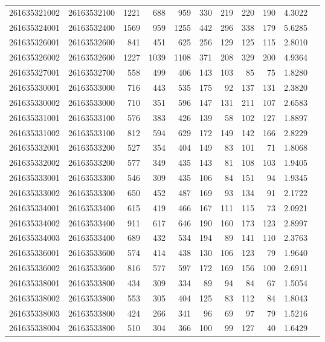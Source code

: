 \documentclass[11pt,landscape]{article}
\begin{document}
{\begin{longtable}[]{@{}lrrrrrrrrrr@{}}
261635321002 & 26163532100 & 1221 & 688 & 959 & 330 & 219 & 220 & 190 & 4.3022 \\
261635324001 & 26163532400 & 1569 & 959 & 1255 & 442 & 296 & 338 & 179 & 5.6285 \\
261635326001 & 26163532600 & 841 & 451 & 625 & 256 & 129 & 125 & 115 & 2.8010 \\
261635326002 & 26163532600 & 1227 & 1039 & 1108 & 371 & 208 & 329 & 200 & 4.9364 \\
261635327001 & 26163532700 & 558 & 499 & 406 & 143 & 103 & 85 & 75 & 1.8280 \\
261635330001 & 26163533000 & 716 & 443 & 535 & 175 & 92 & 137 & 131 & 2.3820 \\
261635330002 & 26163533000 & 710 & 351 & 596 & 147 & 131 & 211 & 107 & 2.6583 \\
261635331001 & 26163533100 & 576 & 383 & 426 & 139 & 58 & 102 & 127 & 1.8897 \\
261635331002 & 26163533100 & 812 & 594 & 629 & 172 & 149 & 142 & 166 & 2.8229 \\
261635332001 & 26163533200 & 527 & 354 & 404 & 149 & 83 & 101 & 71 & 1.8068 \\
261635332002 & 26163533200 & 577 & 349 & 435 & 143 & 81 & 108 & 103 & 1.9405 \\
261635333001 & 26163533300 & 546 & 309 & 435 & 106 & 84 & 151 & 94 & 1.9345 \\
261635333002 & 26163533300 & 650 & 452 & 487 & 169 & 93 & 134 & 91 & 2.1722 \\
261635334001 & 26163533400 & 615 & 419 & 466 & 167 & 111 & 115 & 73 & 2.0921 \\
261635334002 & 26163533400 & 911 & 617 & 646 & 190 & 160 & 173 & 123 & 2.8997 \\
261635334003 & 26163533400 & 689 & 432 & 534 & 194 & 89 & 141 & 110 & 2.3763 \\
261635336001 & 26163533600 & 574 & 414 & 438 & 130 & 106 & 123 & 79 & 1.9640 \\
261635336002 & 26163533600 & 816 & 577 & 597 & 172 & 169 & 156 & 100 & 2.6911 \\
261635338001 & 26163533800 & 434 & 309 & 334 & 89 & 94 & 84 & 67 & 1.5054 \\
261635338002 & 26163533800 & 553 & 305 & 404 & 125 & 83 & 112 & 84 & 1.8043 \\
261635338003 & 26163533800 & 424 & 266 & 341 & 96 & 69 & 97 & 79 & 1.5216 \\
261635338004 & 26163533800 & 510 & 304 & 366 & 100 & 99 & 127 & 40 & 1.6429 \\

\end{longtable}}
\end{document}
